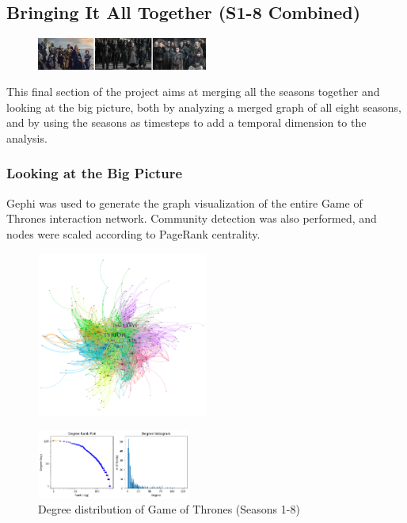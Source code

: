 \documentclass[10pt,twocolumn,letterpaper]{article}
\begin{document}
\newpage

\subsection{Bringing It All Together (S1-8 Combined)}

\begin{figure}[!h]
    \centering
    \includegraphics[width=0.5\textwidth]{img/all_seasons/group_frames.jpg}
\end{figure}

This final section of the project aims at merging all the seasons together and looking at the big picture, both by analyzing a merged graph of all eight seasons, and by using the seasons as timesteps to add a temporal dimension to the analysis.

\subsubsection{Looking at the Big Picture}

Gephi was used to generate the graph visualization of the entire Game of Thrones interaction network. Community detection was also performed, and nodes were scaled according to PageRank centrality.

\begin{figure}[!h]
    \centering
    \includegraphics[width=0.5\textwidth]{img/all_seasons/gephi_all_seasons_graph.png}
\end{figure}

\begin{figure}[!h]
    \centering
    \includegraphics[width=0.45\textwidth]{img/all_seasons/degree_plot.jpg}
    \caption{\small{Degree distribution of Game of Thrones (Seasons 1-8)}}
\end{figure}
\end{document}

